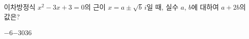 이차방정식 $x^2-3x+3=0$의 근이 $x=a\pm\sqrt{b}\,i$일 때, 실수 $a$, $b$에 대하여 $a+2b$의 값은?
\begin{choices32}{$-6$}{$-3$}{$0$}{$3$}{$6$}\end{choices32}
